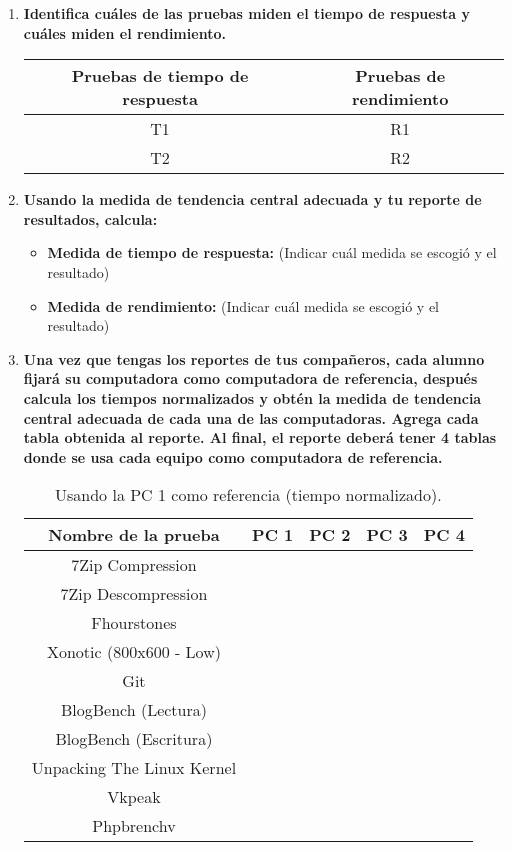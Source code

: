 \documentclass[12pt]{article}
\newcommand{\pl}[1]{\item \textbf{ #1 }}
\begin{document}
\begin{enumerate}[label=(\arabic{section}.\arabic{subsection}.\arabic{enumi})]
    \pl{Identifica cuáles de las pruebas miden el tiempo de respuesta y cuáles miden el rendimiento.}
    \begin{table}[htb]
        \centering
        \begin{tabular}{|c|c|}
        \hline
        Pruebas de tiempo de respuesta & Pruebas de rendimiento \\
        \hline
        T1 & R1 \\
        \hline
        T2 & R2 \\
        \hline
        \end{tabular}
    \end{table}\par

    \pl{Usando la medida de tendencia central adecuada y tu reporte de resultados, calcula:}
    \begin{itemize}
        \pl{Medida de tiempo de respuesta:}(Indicar cuál medida se escogió y el resultado)\par
    
        \pl{Medida de rendimiento:} (Indicar cuál medida se escogió y el resultado)\par
    \end{itemize}

    \pl{Una vez que tengas los reportes de tus compañeros, cada alumno fijará su computadora como computadora de referencia, después calcula los tiempos normalizados y obtén la medida de tendencia central adecuada de cada una de las computadoras. Agrega cada tabla obtenida al reporte. Al final, el reporte deberá tener 4 tablas donde se usa cada equipo como computadora de referencia.}

     \begin{table}[htb]
    	\centering
    	\begin{tabular}{|c|c|c|c|c|}
    		\hline
    		\textbf{Nombre de la prueba} & \textbf{PC 1} & \textbf{PC 2} & \textbf{PC 3} & \textbf{PC 4}\\
    		\hline
    		7Zip Compression &  &  & & \\
    		\hline
    		7Zip Descompression&  &  & & \\
    		\hline
    		Fhourstones &  &  & &\\
    		\hline
    		Xonotic (800x600 - Low) &  &  & &\\
    		\hline
    		Git &  &  & &\\
    		\hline
    		BlogBench (Lectura) &  &  & &\\
    		\hline
    		BlogBench (Escritura)&  &  & &\\
    		\hline
    		Unpacking The Linux Kernel & &  &  &  \\
    		\hline
    		Vkpeak &  &  & & \\
    		\hline
    		Phpbrenchv & &  &  & \\
    		\hline
    	\end{tabular}
    	\caption{Usando la PC 1 como referencia (tiempo normalizado).}
    \end{table}


\end{enumerate}
\end{document}
